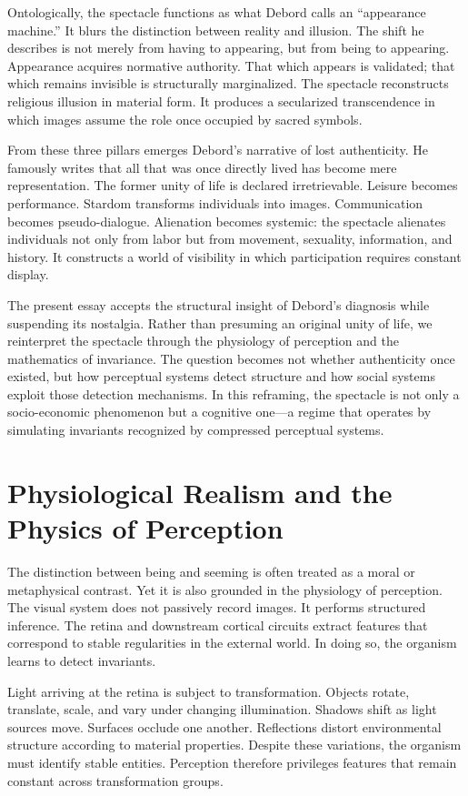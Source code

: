 \documentclass[11pt]{article}
\begin{document}
Ontologically, the spectacle functions as what Debord calls an ``appearance machine.'' It blurs the distinction between reality and illusion. The shift he describes is not merely from having to appearing, but from being to appearing. Appearance acquires normative authority. That which appears is validated; that which remains invisible is structurally marginalized. The spectacle reconstructs religious illusion in material form. It produces a secularized transcendence in which images assume the role once occupied by sacred symbols.

From these three pillars emerges Debord's narrative of lost authenticity. He famously writes that all that was once directly lived has become mere representation. The former unity of life is declared irretrievable. Leisure becomes performance. Stardom transforms individuals into images. Communication becomes pseudo-dialogue. Alienation becomes systemic: the spectacle alienates individuals not only from labor but from movement, sexuality, information, and history. It constructs a world of visibility in which participation requires constant display.

The present essay accepts the structural insight of Debord's diagnosis while suspending its nostalgia. Rather than presuming an original unity of life, we reinterpret the spectacle through the physiology of perception and the mathematics of invariance. The question becomes not whether authenticity once existed, but how perceptual systems detect structure and how social systems exploit those detection mechanisms. In this reframing, the spectacle is not only a socio-economic phenomenon but a cognitive one---a regime that operates by simulating invariants recognized by compressed perceptual systems.

\section{Physiological Realism and the Physics of Perception}

The distinction between being and seeming is often treated as a moral or metaphysical contrast. Yet it is also grounded in the physiology of perception. The visual system does not passively record images. It performs structured inference. The retina and downstream cortical circuits extract features that correspond to stable regularities in the external world. In doing so, the organism learns to detect invariants.

Light arriving at the retina is subject to transformation. Objects rotate, translate, scale, and vary under changing illumination. Shadows shift as light sources move. Surfaces occlude one another. Reflections distort environmental structure according to material properties. Despite these variations, the organism must identify stable entities. Perception therefore privileges features that remain constant across transformation groups.
\end{document}
